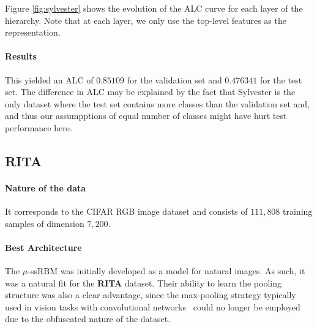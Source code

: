 Figure \ref{fig:sylvester} shows the evolution of the ALC curve for each layer of the
hierarchy.  Note that at each layer, we only use the top-level features as the
representation.

\paragraph{Results}

This yielded an ALC of $0.85109$ for the validation set and $0.476341$ for the test set.
The difference in ALC may be explained by the fact that Sylvester is the only dataset where
the test set contains more classes than the validation set and, and thus our
assumpptions of equal number of classes might have hurt test performance here.


\subsection{RITA}



\paragraph{Nature of the data} It corresponds to the CIFAR RGB image dataset and consists of $111,808$ training samples of dimension $7,200$.

\paragraph{Best Architecture}



The $\mu$-ssRBM was initially developed as a model for natural images. As such,
it was a natural fit for the {\bf RITA} dataset. Their ability to learn the pooling
structure was also a clear advantage, since the max-pooling strategy typically
used in vision tasks with convolutional networks~\citep{LeCun98-small} could no longer be employed due to the
obfuscated nature of the dataset.

